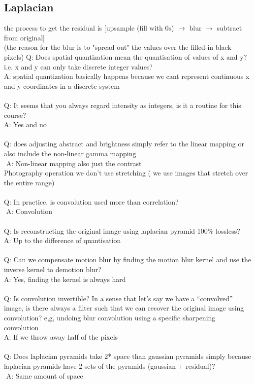 \documentclass[11pt]{article}
\begin{document}
\subsection*{Laplacian}
the process to get the residual is [upsample (fill with 0s) $\rightarrow$ blur $\rightarrow$ subtract from original]\\
(the reason for the blur is to "spread out" the values over the filled-in black pixels)
\newpage
\noindent
Q: Does spatial quantization mean the quantisation of values of x and y? i.e. x and y can only take discrete integer values?\\
A: spatial quantization basically happens because we cant represent continuous x and y coordinates in a discrete system\\
\\
Q: It seems that you always regard intensity as integers, is it a routine for this course?\\
A: Yes and no\\
\\
Q: does adjusting abstract and brightness simply refer to the linear mapping or also include the non-linear gamma mapping\\ A: Non-linear mapping also just the contrast\\
Photography operation we don’t use stretching ( we use images that stretch over the entire range)
\\\\
Q: In practice, is convolution used more than correlation?\\ A: Convolution\\
\\
Q: Is reconstructing the original image using laplacian pyramid 100\% lossless?\\
A: Up to the difference of quantisation
\\\\
Q: Can we compensate motion blur by finding the motion blur kernel and use the inverse kernel to demotion blur?\\
A: Yes, finding the kernel is always hard
\\\\
Q: Is convolution invertible? In a sense that let's say we have a “convolved” image, is there always a filter such that we can recover the original image using convolution? e,g, undoing blur convolution using a specific sharpening convolution\\
A: If we throw away half of the pixels
\\\\
Q: Does laplacian pyramids take 2* space than gaussian pyramids simply because laplacian pyramids have 2 sets of the pyramids (gaussian + residual)?\\ A: Same amount of space
\\\\
\end{document}
